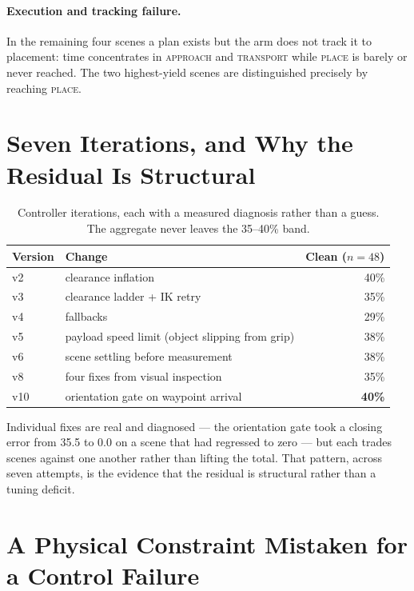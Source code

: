 \documentclass[a4paper,11pt]{report}
\begin{document}
\paragraph{Execution and tracking failure.}
In the remaining four scenes a plan exists but the arm does not track it to placement: time
concentrates in \textsc{approach} and \textsc{transport} while \textsc{place} is barely or never
reached. The two highest-yield scenes are distinguished precisely by reaching \textsc{place}.

\section{Seven Iterations, and Why the Residual Is Structural}

\begin{table}[htbp]
\centering
\caption{Controller iterations, each with a measured diagnosis rather than a guess. The aggregate
  never leaves the 35--40\% band.}
\label{tab:planner_iterations}
\begin{tabular}{llr}
\toprule
\textbf{Version} & \textbf{Change} & \textbf{Clean ($n=48$)} \\
\midrule
v2  & clearance inflation                            & 40\% \\
v3  & clearance ladder + IK retry                    & 35\% \\
v4  & fallbacks                                      & 29\% \\
v5  & payload speed limit (object slipping from grip) & 38\% \\
v6  & scene settling before measurement              & 38\% \\
v8  & four fixes from visual inspection              & 35\% \\
v10 & orientation gate on waypoint arrival           & \textbf{40\%} \\
\bottomrule
\end{tabular}
\end{table}

Individual fixes are real and diagnosed --- the orientation gate took a closing error from
35.5\textdegree{} to 0.0\textdegree{} on a scene that had regressed to zero --- but each trades
scenes against one another rather than lifting the total. That pattern, across seven attempts, is
the evidence that the residual is structural rather than a tuning deficit.

\section{A Physical Constraint Mistaken for a Control Failure}
\end{document}
